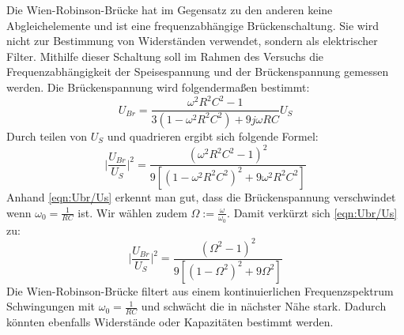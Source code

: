 Die Wien-Robinson-Brücke hat im Gegensatz zu den anderen keine Abgleichelemente und ist eine frequenzabhängige Brückenschaltung. Sie wird
nicht zur Bestimmung von Widerständen verwendet, sondern als elektrischer Filter. Mithilfe dieser Schaltung soll im Rahmen des Versuchs die
Frequenzabhängigkeit der Speisespannung und der Brückenspannung gemessen werden.
Die Brückenspannung wird folgendermaßen bestimmt:
\begin{equation}
    U_{Br} = \frac{\omega ^2 R^2 C^2 - 1}{3(1- \omega ^2 R^2 C^2) + 9 j \omega RC}U_S
\end{equation}
Durch teilen von $U_S$ und quadrieren ergibt sich folgende Formel:
\begin{equation}
    \biggl|\frac{U_{Br}}{U_S}\biggl|^2 = \frac{(\omega ^2 R^2 C^2 - 1)^2}{9[(1- \omega ^2 R^2 C^2)^2 + 9 \omega^2 R^2C^2]} \label{eqn:Ubr/Us}
\end{equation}
Anhand \autoref{eqn:Ubr/Us} erkennt man gut, dass die Brückenspannung verschwindet wenn $\omega_0 = \frac{1}{RC}$ ist. Wir wählen zudem $\Omega := \frac{\omega}{\omega_0}$.
Damit verkürzt sich \autoref{eqn:Ubr/Us} zu:
\begin{equation}
    \biggl|\frac{U_{Br}}{U_S}\biggl|^2 = \frac{(\Omega ^2 - 1)^2}{9[(1-\Omega ^2)^2 + 9 \Omega ^2]} \label{eqn:Omega}
\end{equation}
Die Wien-Robinson-Brücke filtert aus einem kontinuierlichen Frequenzspektrum Schwingungen mit $\omega_0 = \frac{1}{RC}$ und schwächt die in nächster Nähe stark. Dadurch
könnten ebenfalls Widerstände oder Kapazitäten bestimmt werden.
\newpage